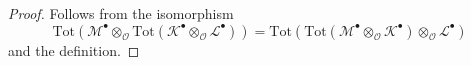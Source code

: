 \documentclass[10pt,a4paper]{amsart}
\theoremstyle{plain}
\theoremstyle{definition}
\theoremstyle{remark}
\numberwithin{equation}{subsection}
\begin{document}
\begin{proof}
Follows from the isomorphism
$$
\text{Tot}(\mathcal{M}^\bullet \otimes_\mathcal{O}
\text{Tot}(\mathcal{K}^\bullet \otimes_\mathcal{O} \mathcal{L}^\bullet))
=
\text{Tot}(\text{Tot}(\mathcal{M}^\bullet \otimes_\mathcal{O}
\mathcal{K}^\bullet) \otimes_\mathcal{O} \mathcal{L}^\bullet)
$$
and the definition.
\end{proof}
\end{document}
